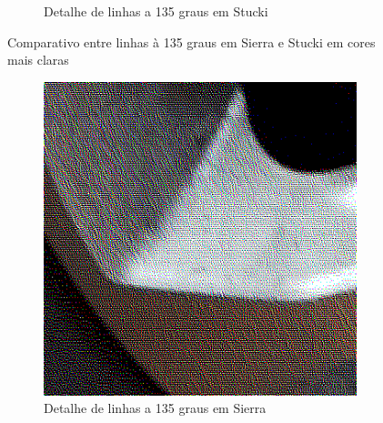 \documentclass[brazilian,a4paper,twocolumn]{article}
\begin{document}
\begin{figure}
\begin{subfigure}{0.24\textwidth}
                \caption{Detalhe de linhas a 135 graus em Stucki}
            \end{subfigure}

            \caption{Comparativo entre linhas à 135 graus em Sierra e Stucki em cores mais claras}
            \label{fig:binarizada-sierra-stucki-claras}
        \end{figure}

        \begin{figure}
            \centering
            \begin{subfigure}{0.24\textwidth}
                \includegraphics[width=\textwidth,keepaspectratio]{../imgs/mel_binarizada-sierra-detalhe2.png}
                \caption{Detalhe de linhas a 135 graus em Sierra}
            \end{subfigure}
            \begin{subfigure}{0.24\textwidth}

\end{subfigure}
\end{figure}
\end{document}
